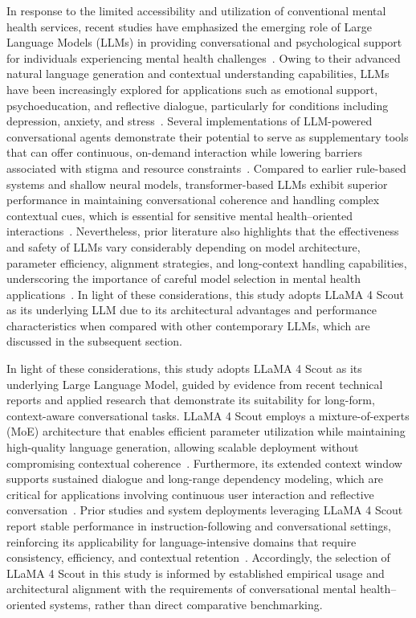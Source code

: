 \documentclass[sigconf]{acmart}
\begin{document}
In response to the limited accessibility and utilization of conventional mental health services, recent studies have emphasized the emerging role of Large Language Models (LLMs) in providing conversational and psychological support for individuals experiencing mental health challenges~\cite{hua_large_2025}. Owing to their advanced natural language generation and contextual understanding capabilities, LLMs have been increasingly explored for applications such as emotional support, psychoeducation, and reflective dialogue, particularly for conditions including depression, anxiety, and stress~\cite{noauthor_applications_2025}. Several implementations of LLM-powered conversational agents demonstrate their potential to serve as supplementary tools that can offer continuous, on-demand interaction while lowering barriers associated with stigma and resource constraints~\cite{lawrence_opportunities_2024}. Compared to earlier rule-based systems and shallow neural models, transformer-based LLMs exhibit superior performance in maintaining conversational coherence and handling complex contextual cues, which is essential for sensitive mental health--oriented interactions~\cite{cho_task-specific_2024}. Nevertheless, prior literature also highlights that the effectiveness and safety of LLMs vary considerably depending on model architecture, parameter efficiency, alignment strategies, and long-context handling capabilities, underscoring the importance of careful model selection in mental health applications~\cite{lawrence_opportunities_2024}. In light of these considerations, this study adopts LLaMA 4 Scout as its underlying LLM due to its architectural advantages and performance characteristics when compared with other contemporary LLMs, which are discussed in the subsequent section.

In light of these considerations, this study adopts LLaMA 4 Scout as its underlying Large Language Model, guided by evidence from recent technical reports and applied research that demonstrate its suitability for long-form, context-aware conversational tasks. LLaMA 4 Scout employs a mixture-of-experts (MoE) architecture that enables efficient parameter utilization while maintaining high-quality language generation, allowing scalable deployment without compromising contextual coherence~\cite{noauthor_llama_nodate}. Furthermore, its extended context window supports sustained dialogue and long-range dependency modeling, which are critical for applications involving continuous user interaction and reflective conversation~\cite{noauthor_llama_nodate}. Prior studies and system deployments leveraging LLaMA 4 Scout report stable performance in instruction-following and conversational settings, reinforcing its applicability for language-intensive domains that require consistency, efficiency, and contextual retention~\cite{noauthor_llama_nodate}. Accordingly, the selection of LLaMA 4 Scout in this study is informed by established empirical usage and architectural alignment with the requirements of conversational mental health--oriented systems, rather than direct comparative benchmarking.
\end{document}
